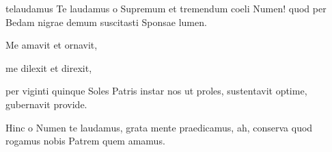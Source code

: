 \documentclass{ees}
\begin{document}
{\begin{movement}{telaudamus}
  \voice[Coro]
  Te laudamus o Supremum
  et tremendum coeli Numen!
  quod per Bedam nigrae demum
  suscitasti Sponsae lumen.

  Me amavit et ornavit,

  \voice[Levita]
  me dilexit et direxit,

  per viginti quinque Soles
  Patris instar nos ut proles,
  sustentavit optime,
  gubernavit provide.

  \voice[Coro]
  Hinc o Numen te laudamus,
  grata mente praedicamus,
  ah, conserva quod rogamus
  nobis Patrem quem amamus.
\end{movement}




}

\eesScore
\end{document}
